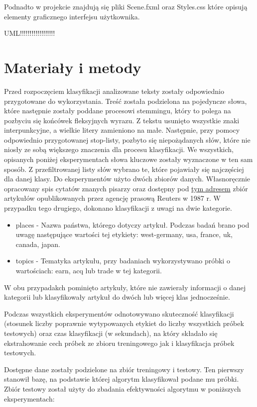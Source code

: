 \documentclass{classrep}
\begin{document}
Podnadto w projekcie znajdują się pliki Scene.fxml oraz Styles.css które opisują elementy graficznego interfejsu użytkownika.

{\color{blue} UML!!!!!!!!!!!!!!!!!!}

\section{Materiały i metody}
Przed rozpoczęciem klasyfikacji analizowane teksty zostały odpowiednio przygotowane do wykorzystania. Treść została podzielona na pojedyncze słowa, które następnie zostały poddane procesowi stemmingu, który to polega na pozbyciu się końcówek fleksyjnych wyrazu. Z tekstu usunięto wszystkie znaki interpunkcyjne, a wielkie litery zamieniono na małe. Następnie, przy pomocy odpowiednio przygotowanej stop-listy, pozbyto się niepożądanych słów, które nie niosły ze sobą większego znaczenia dla procesu klasyfikacji.
We wszystkich, opisanych poniżej eksperymentach słowa kluczowe zostały wyznaczone w ten sam sposób. Z przefiltrowanej listy słów wybrano te, które pojawiały się najczęściej dla danej klasy. 
Do eksperymentów użyto dwóch zbiorów danych. Własnoręcznie opracowany spis cytatów znanych pisarzy oraz dostępny pod \href{http://archive.ics.uci.edu/ml/datasets/Reuters-21578+Text+Categorization+Collection}{tym adresem} zbiór artykułów opublikowanych przez agencję prasową Reuters w 1987 r. W przypadku tego drugiego, dokonano klasyfikacji z uwagi na dwie kategorie.
\begin{itemize}
	\item places - Nazwa państwa, którego dotyczy artykuł. Podczas badań brano pod uwagę następujące wartości tej etykiety: west-germany, usa, france, uk, canada, japan.
	\item topics - Tematyka artykułu, przy badaniach wykorzystywano próbki o wartościach: earn, acq lub trade w tej kategorii.
\end{itemize}
W obu przypadakch pominięto artykuły, które nie zawierały informacji o danej kategorii lub klasyfikowały artykuł do dwóch lub więcej klas jednocześnie.

Podczas wszystkich eksperymentów odnotowywano skuteczność klasyfikacji (stosunek liczby poprawnie wytypowanych etykiet do liczby wszystkich próbek testowych) oraz czas klasyfikacji (w sekundach), na który składało się ekstrahowanie cech próbek ze zbioru treningowego jak i klasyfikacja próbek testowych.

Dostępne dane zostały podzielone na zbiór treningowy i testowy. Ten pierwszy stanowił bazę, na podstawie której algorytm klasyfikował podane mu próbki. Zbiór testowy został użyty do zbadania efektywności algorytmu w poniższych eksperymentach:
\end{document}
